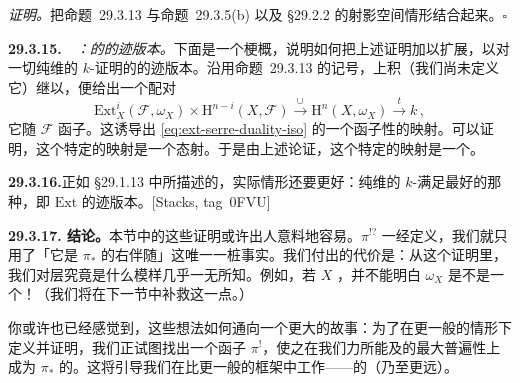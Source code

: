 \emph{证明。}\quad 把\mbox{命题~29.3.13} 与\mbox{命题~29.3.5(b)} 以及 \S29.2.2 的射影空间情形结合起来。\hfill$\square$

\textbf{29.3.15.}\ \extrahard\ \emph{\trhRemark：\trVectorBundle{}的\trSerreDuality{}的迹版本。}\quad 下面是一个梗概，说明如何把上述证明加以扩展，以对一切纯维的 \trCM{} \trProjective{} $k$-\trScheme{}证明\trVectorBundle{}的\trSerreDuality{}的迹版本。沿用\mbox{命题~29.3.13} 的记号，\trYoneda{}上积（我们尚未定义它）继以\trTraceMap，便给出一个配对
\[
\mathrm{Ext}^i_X(\mathscr{F},\omega_X)\times\mathrm{H}^{n-i}(X,\mathscr{F})\overset{\cup}{\longrightarrow}\mathrm{H}^n(X,\omega_X)\overset{t}{\longrightarrow} k\,,
\]
它随 $\mathscr{F}$ 函子。这诱导出 \eqref{eq:ext-serre-duality-iso} 的一个函子性的映射。可以证明，这个特定的映射是一个\trDeltaFunctor{}态射。于是由上述论证，这个特定的映射是一个\trIsomorphism。

\textbf{29.3.16.}\quad 正如 \S29.1.13 中所描述的，实际情形还要更好：纯维的\trProper{} $k$-\trScheme{}满足最好的那种\trSerreDuality，即 $\mathrm{Ext}$ 的迹版本。[Stacks, tag~0FVU]

\textbf{29.3.17. 结论。}\quad 本节中的这些证明或许出人意料地容易。$\pi^{!?}$ 一经定义，我们就只用了「它是 $\pi_*$ 的右伴随」这唯一一桩事实。我们付出的代价是：从这个证明里，我们对\trCanonical{}层究竟是什么模样几乎一无所知。例如，若 $X$ \trSmooth，并不能明白 $\omega_X$ 是不是一个\trLineBundle！（我们将在下一节中补救这一点。）

你或许也已经感觉到，这些想法如何通向一个更大的故事：为了在更一般的情形下定义并证明\trDuality，我们正试图找出一个函子 $\pi^!$，使之在我们力所能及的最大普遍性上成为 $\pi_*$ 的\trRightAdjoint。这将引导我们在比\trCoherentSheaf{}更一般的框架中工作——\trCoherentSheaf{}的\trDerivedCategory{}（乃至更远）。
